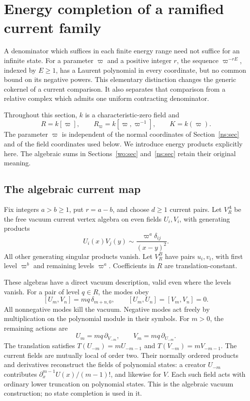 \section{Energy completion of a ramified current family}
\label{rc:sec}

A denominator which suffices in each finite energy range need not
suffice for an infinite state.  For a parameter \(\varpi\) and a
positive integer \(r\), the sequence \(\varpi^{-rE}\), indexed by
\(E\geq1\), has a Laurent polynomial
in every coordinate, but no common bound on its negative powers.
This elementary distinction changes the generic cokernel of a
current comparison.  It also separates that comparison from a
relative complex which admits one uniform contracting denominator.

Throughout this section, \(k\) is a characteristic-zero field and
\[
 R=k[\varpi],\qquad R_\varpi=k[\varpi,\varpi^{-1}],
 \qquad K=k(\varpi).
\]
The parameter \(\varpi\) is independent of the normal
coordinates of Section~\ref{ns:sec} and of the field coordinates
used below.  We introduce energy products explicitly here.
The algebraic sums in Sections~\ref{wo:sec} and~\ref{ns:sec}
retain their original meaning.

\subsection{The algebraic current map}

Fix integers \(a>b\geq1\), put \(r=a-b\), and choose \(d\geq1\)
current pairs.  Let \(V_R^A\) be the free vacuum current vertex
algebra on even fields \(U_i,V_i\), with generating products
\begin{equation}\label{rc:eq:source-ope}
 U_i(x)V_j(y)\sim\frac{\varpi^a\delta_{ij}}{(x-y)^2}.
\end{equation}
All other generating singular products vanish.  Let \(V_R^B\)
have pairs \(u_i,v_i\), with first level \(\varpi^b\) and remaining
levels \(\varpi^a\).  Coefficients in \(R\) are translation-constant.

These algebras have a direct vacuum description, valid even where
the levels vanish.  For a pair of level \(q\in R\), the modes obey
\[
 [U_m,V_n]=m q\,\delta_{m+n,0},\qquad
 [U_m,U_n]=[V_m,V_n]=0.
\]
All nonnegative modes kill the vacuum.  Negative modes act freely
by multiplication on the polynomial module in their symbols.
For \(m>0\), the remaining actions are
\begin{equation}\label{rc:eq:positive-modes}
 U_m=mq\,\partial_{V_{-m}},\qquad
 V_m=mq\,\partial_{U_{-m}}.
\end{equation}
The translation satisfies
\(T(U_{-m})=mU_{-m-1}\) and \(T(V_{-m})=mV_{-m-1}\).
The current fields are mutually local of order two.
Their normally ordered products and derivatives reconstruct the
fields of polynomial states: a creator \(U_{-m}\) contributes
\(\partial_x^{m-1}U(x)/(m-1)!\), and likewise for \(V\).
Each such field acts with ordinary lower truncation on polynomial
states.  This is the algebraic vacuum construction; no state
completion is used in it.

